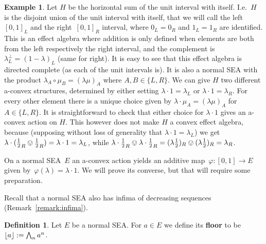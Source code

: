 \documentclass[a4paper, onecolumn, accepted=2020-12-22]{quantumarticle}
\DeclarePairedDelimiter{\floor}{\lfloor}{\rfloor}
\newcommand\Define[1]{\textbf{#1}}
\newcommand{\mult}{\mathop{\circ}}
\newcounter{counter}
\theoremstyle{definition}
\newtheorem{definition}[counter]{Definition}
\newtheorem{example}[counter]{Example}
\begin{document}
\begin{example}\label{ex:horizontal-interval}
    Let $H$ be the horizontal sum of the unit interval with
    itself. I.e.\ $H$ is the disjoint union of the unit interval
    with itself, that we will call the left~$[0,1]_L$ and the
    right~$[0,1]_R$ interval, where $0_L = 0_R$ and $1_L=1_R$ are
    identified.  This is an effect algebra where addition is only
    defined when elements are both from the left respectively the
    right interval, and the complement is $\lambda_L^\perp =
    (1-\lambda)_L$ (same for right). It is easy to see that this
    effect algebra is directed complete (as each of the unit intervals is). It is also a normal SEA
    with the product $\lambda_A\mult \mu_B = (\lambda\mu)_A$ where
    $A,B\in \{L,R\}$.  We can give $H$ two different a-convex
    structures, determined by either setting $\lambda\cdot 1 =
    \lambda_L$ or $\lambda\cdot 1 = \lambda_R$. For every other
    element there is a unique choice given by $\lambda\cdot \mu_A
    = (\lambda\mu)_A$ for $A\in \{L,R\}$.
    It is straightforward to check that either choice for $\lambda\cdot
    1$ gives an a-convex action on $H$. This however does not
    make $H$ a convex effect algebra, because (supposing without
    loss of generality that $\lambda\cdot 1 = \lambda_L$) we get
    $\lambda \cdot (\frac12_R \ovee \frac12_R) = \lambda\cdot 1 =
    \lambda_L$, while $\lambda \cdot \frac12_R \ovee \lambda \cdot
    \frac12_R = (\lambda \frac12)_R \ovee (\lambda \frac12)_R =
    \lambda_R$.
\end{example}

\noindent On a normal SEA~$E$ an a-convex action
    yields an additive map~$\varphi\colon [0,1] \to E$
            given by~$\varphi(\lambda) = \lambda\cdot 1$.
We will prove its converse, but that will require some preparation.

Recall that a normal SEA also has infima of decreasing sequences (Remark~\ref{remark:infima}).

\begin{definition}\label{def:floor}
    Let $E$ be a normal SEA. For $a\in E$ we define its \Define{floor} to be $\floor{a} := \bigwedge_n a^n$.
\end{definition}
\end{document}
